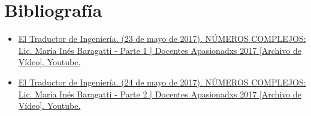 \documentclass[12pt, twocolumn]{article}
\begin{document}
\section{Bibliografía}
\begin{itemize}
    \item \href{https://www.youtube.com/watch?v=5FemcGdN3Xw}{\small El Traductor de Ingeniería. (23 de mayo de 2017). NÚMEROS COMPLEJOS: Lic. María Inés Baragatti - Parte 1 | Docentes Apasionadxs 2017 [Archivo de Vídeo]. Youtube.}
    \item \href{https://www.youtube.com/watch?v=f7iOdIaourk}{\small El Traductor de Ingeniería. (24 de mayo de 2017). NÚMEROS COMPLEJOS: Lic. María Inés Baragatti - Parte 2 | Docentes Apasionadxs 2017 [Archivo de Vídeo]. Youtube.}
\end{itemize}
\end{document}
